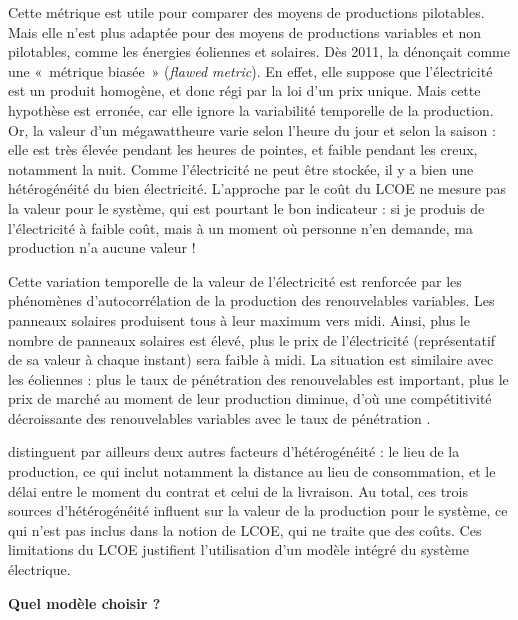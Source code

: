 Cette métrique est utile pour comparer des moyens de productions pilotables. Mais elle n’est plus adaptée pour des moyens de productions variables et non pilotables, comme les énergies éoliennes et solaires. Dès 2011, \citet{Joskow2011a} la dénonçait comme une «~métrique biasée~» (\textit{flawed metric}). En effet, elle suppose que l’électricité est un produit homogène, et donc régi par la loi d’un prix unique. Mais cette hypothèse est erronée, car elle ignore la variabilité temporelle de la production. Or, la valeur d’un mégawattheure varie selon l’heure du jour et selon la saison : elle est très élevée pendant les heures de pointes, et faible pendant les creux, notamment la nuit. Comme l’électricité ne peut être stockée, il y a bien une hétérogénéité du bien électricité. L’approche par le coût du LCOE ne mesure pas la valeur pour le système, qui est pourtant le bon indicateur : si je produis de l’électricité à faible coût, mais à un moment où personne n’en demande, ma production n’a aucune valeur !

Cette variation temporelle de la valeur de l'électricité est renforcée par les phénomènes d’autocorrélation de la production des renouvelables variables. Les panneaux solaires produisent tous à leur maximum vers midi. Ainsi, plus le nombre de panneaux solaires est élevé, plus le prix de l’électricité (représentatif de sa valeur à chaque instant) sera faible à midi. La situation est similaire avec les éoliennes : plus le taux de pénétration des renouvelables est important, plus le prix de marché au moment de leur production diminue, d’où une compétitivité décroissante des renouvelables variables avec le taux de pénétration \citep{Hirth2013}.

\citet{Hirth2016} distinguent par ailleurs deux autres facteurs d’hétérogénéité : le lieu de la production, ce qui inclut notamment la distance au lieu de consommation, et le délai entre le moment du contrat et celui de la livraison. Au total, ces trois sources d’hétérogénéité influent sur la valeur de la production pour le système, ce qui n’est pas inclus dans la notion de LCOE, qui ne traite que des coûts. 
Ces limitations du LCOE justifient l’utilisation d’un modèle intégré du système électrique.

\vspace{1em}
\textbf{Quel modèle choisir ?}


